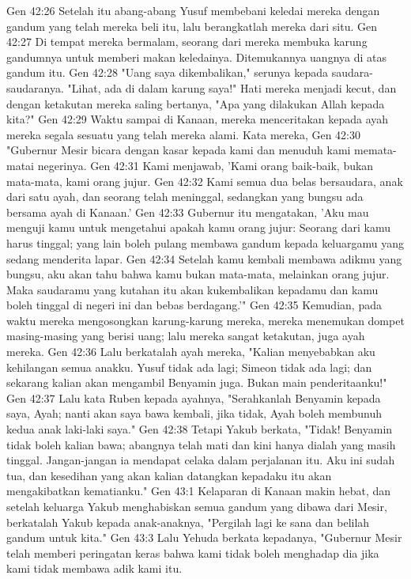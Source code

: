 Gen 42:26  Setelah itu abang-abang Yusuf membebani keledai mereka dengan gandum yang telah mereka beli itu, lalu berangkatlah mereka dari situ.
Gen 42:27  Di tempat mereka bermalam, seorang dari mereka membuka karung gandumnya untuk memberi makan keledainya. Ditemukannya uangnya di atas gandum itu.
Gen 42:28  "Uang saya dikembalikan," serunya kepada saudara-saudaranya. "Lihat, ada di dalam karung saya!" Hati mereka menjadi kecut, dan dengan ketakutan mereka saling bertanya, "Apa yang dilakukan Allah kepada kita?"
Gen 42:29  Waktu sampai di Kanaan, mereka menceritakan kepada ayah mereka segala sesuatu yang telah mereka alami. Kata mereka,
Gen 42:30  "Gubernur Mesir bicara dengan kasar kepada kami dan menuduh kami memata-matai negerinya.
Gen 42:31  Kami menjawab, 'Kami orang baik-baik, bukan mata-mata, kami orang jujur.
Gen 42:32  Kami semua dua belas bersaudara, anak dari satu ayah, dan seorang telah meninggal, sedangkan yang bungsu ada bersama ayah di Kanaan.'
Gen 42:33  Gubernur itu mengatakan, 'Aku mau menguji kamu untuk mengetahui apakah kamu orang jujur: Seorang dari kamu harus tinggal; yang lain boleh pulang membawa gandum kepada keluargamu yang sedang menderita lapar.
Gen 42:34  Setelah kamu kembali membawa adikmu yang bungsu, aku akan tahu bahwa kamu bukan mata-mata, melainkan orang jujur. Maka saudaramu yang kutahan itu akan kukembalikan kepadamu dan kamu boleh tinggal di negeri ini dan bebas berdagang.'"
Gen 42:35  Kemudian, pada waktu mereka mengosongkan karung-karung mereka, mereka menemukan dompet masing-masing yang berisi uang; lalu mereka sangat ketakutan, juga ayah mereka.
Gen 42:36  Lalu berkatalah ayah mereka, "Kalian menyebabkan aku kehilangan semua anakku. Yusuf tidak ada lagi; Simeon tidak ada lagi; dan sekarang kalian akan mengambil Benyamin juga. Bukan main penderitaanku!"
Gen 42:37  Lalu kata Ruben kepada ayahnya, "Serahkanlah Benyamin kepada saya, Ayah; nanti akan saya bawa kembali, jika tidak, Ayah boleh membunuh kedua anak laki-laki saya."
Gen 42:38  Tetapi Yakub berkata, "Tidak! Benyamin tidak boleh kalian bawa; abangnya telah mati dan kini hanya dialah yang masih tinggal. Jangan-jangan ia mendapat celaka dalam perjalanan itu. Aku ini sudah tua, dan kesedihan yang akan kalian datangkan kepadaku itu akan mengakibatkan kematianku."
Gen 43:1  Kelaparan di Kanaan makin hebat, dan setelah keluarga Yakub menghabiskan semua gandum yang dibawa dari Mesir, berkatalah Yakub kepada anak-anaknya, "Pergilah lagi ke sana dan belilah gandum untuk kita."
Gen 43:3  Lalu Yehuda berkata kepadanya, "Gubernur Mesir telah memberi peringatan keras bahwa kami tidak boleh menghadap dia jika kami tidak membawa adik kami itu.
